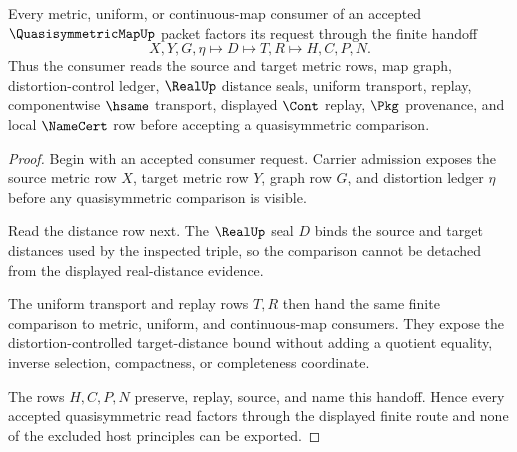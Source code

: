 \begin{theorem}
\label{thm:quasisymmetric-map-metric-handoff}
Every metric, uniform, or continuous-map consumer of an accepted $\QuasisymmetricMapUp$ packet factors its request through the finite handoff
$$
X,Y,G,\eta \longmapsto D \longmapsto T,R \longmapsto H,C,P,N .
$$
Thus the consumer reads the source and target metric rows, map graph, distortion-control ledger, $\RealUp$ distance seals, uniform transport, replay, componentwise $\hsame$ transport, displayed $\Cont$ replay, $\Pkg$ provenance, and local $\NameCert$ row before accepting a quasisymmetric comparison.
\end{theorem}
\begin{proof}
Begin with an accepted consumer request. Carrier admission exposes the source metric row $X$, target metric row $Y$, graph row $G$, and distortion ledger $\eta$ before any quasisymmetric comparison is visible.

Read the distance row next. The $\RealUp$ seal $D$ binds the source and target distances used by the inspected triple, so the comparison cannot be detached from the displayed real-distance evidence.

The uniform transport and replay rows $T,R$ then hand the same finite comparison to metric, uniform, and continuous-map consumers. They expose the distortion-controlled target-distance bound without adding a quotient equality, inverse selection, compactness, or completeness coordinate.

The rows $H,C,P,N$ preserve, replay, source, and name this handoff. Hence every accepted quasisymmetric read factors through the displayed finite route and none of the excluded host principles can be exported.
\end{proof}



